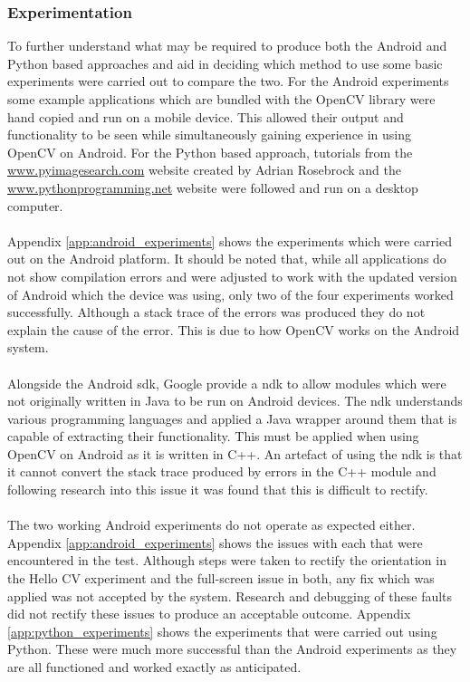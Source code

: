	\subsubsection{Experimentation}\label{sec:methodology_platform_experiments}
		To further understand what may be required to produce both the Android and Python based approaches and aid in deciding which method to use some basic experiments were carried out to compare the two. For the Android experiments some example applications which are bundled with the OpenCV library were hand copied and run on a mobile device. This allowed their output and functionality to be seen while simultaneously gaining experience in using OpenCV on Android. For the Python based approach, tutorials from the \url{www.pyimagesearch.com} website created by Adrian Rosebrock \citep{pyimagesearch} and the \url{www.pythonprogramming.net} website \citep{pythonprogramming} were followed and run on a desktop computer.
		\\\\
		Appendix \ref{app:android_experiments} shows the experiments which were carried out on the Android platform. It should be noted that, while all applications do not show compilation errors and were adjusted to work with the updated version of Android which the device was using, only two of the four experiments worked successfully. Although a stack trace of the errors was produced they do not explain the cause of the error. This is due to how OpenCV works on the Android system.
		\\\\
		Alongside the Android \gls{sdk}, Google provide a \gls{ndk} to allow modules which were not originally written in Java to be run on Android devices. The \gls{ndk} understands various programming languages and applied a Java wrapper around them that is capable of extracting their functionality. This must be applied when using OpenCV on Android as it is written in C++. An artefact of using the \gls{ndk} is that it cannot convert the stack trace produced by errors in the C++ module and following research into this issue it was found that this is difficult to rectify.
		\\\\
		The two working Android experiments do not operate as expected either. Appendix \ref{app:android_experiments} shows the issues with each that were encountered in the test. Although steps were taken to rectify the orientation in the Hello CV experiment and the full-screen issue in both, any fix which was applied was not accepted by the system. Research and debugging of these faults did not rectify these issues to produce an acceptable outcome. Appendix \ref{app:python_experiments} shows the experiments that were carried out using Python. These were much more successful than the Android experiments as they are all functioned and worked exactly as anticipated.
